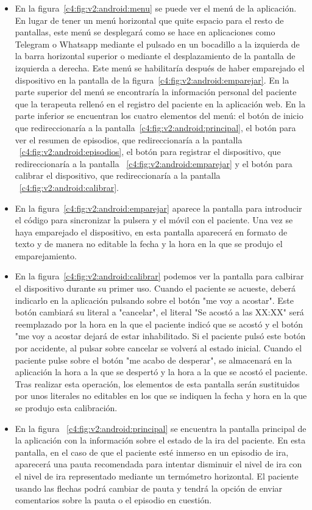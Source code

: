 \begin{itemize}
    \item En la figura~\ref{c4:fig:v2:android:menu} se puede ver el menú de la aplicación. En lugar de tener un menú horizontal que quite espacio para el resto de pantallas, este menú se desplegará como se hace en aplicaciones como Telegram o Whatsapp mediante el pulsado en un bocadillo a la izquierda de la barra horizontal superior o mediante el desplazamiento de la pantalla de izquierda a derecha. Este menú se habilitaría después de haber emparejado el dispositivo en la pantalla de la figura~\ref{c4:fig:v2:android:emparejar}. En la parte superior del menú se encontraría la información personal del paciente que la terapeuta rellenó en el registro del paciente en la aplicación web. En la parte inferior se encuentran los cuatro elementos del menú: el botón de inicio que redireccionaría a la pantalla~\ref{c4:fig:v2:android:principal}, el botón para ver el resumen de episodios, que redireccionaría a la pantalla ~\ref{c4:fig:v2:android:episodios}, el botón para registrar el dispositivo, que redireccionaría a la pantalla ~\ref{c4:fig:v2:android:emparejar} y el botón para calibrar el dispositivo, que redireccionaría a la pantalla ~\ref{c4:fig:v2:android:calibrar}.
    \item En la figura~\ref{c4:fig:v2:android:emparejar} aparece la pantalla para introducir el código para sincronizar la pulsera y el móvil con el paciente. Una vez se haya emparejado el dispositivo, en esta pantalla aparecerá en formato de texto y de manera no editable la fecha y la hora en la que se produjo el emparejamiento.
    \item En la figura~\ref{c4:fig:v2:android:calibrar} podemos ver la pantalla para calbirar el dispositivo durante su primer uso. Cuando el paciente se acueste, deberá indicarlo en la aplicación pulsando sobre el botón "me voy a acostar". Este botón cambiará su literal a "cancelar", el literal "Se acostó a las XX:XX" será reemplazado por la hora en la que el paciente indicó que se acostó y el botón "me voy a acostar dejará de estar inhabilitado. Si el paciente pulsó este botón por accidente, al pulsar sobre cancelar se volverá al estado inicial. Cuando el paciente pulse sobre el botón "me acabo de desperar", se almacenará en la aplicación la hora a la que se despertó y la hora a la que se acostó el paciente. Tras realizar esta operación, los elementos de esta pantalla serán sustituidos por unos literales no editables en los que se indiquen la fecha y hora en la que se produjo esta calibración.
    \item En la figura ~\ref{c4:fig:v2:android:principal} se encuentra la pantalla principal de la aplicación con la información sobre el estado de la ira del paciente. En esta pantalla, en el caso de que el paciente esté inmerso en un episodio de ira, aparecerá una pauta recomendada para intentar disminuir el nivel de ira con el nivel de ira representado mediante un termómetro horizontal. El paciente usando las flechas podrá cambiar de pauta y tendrá la opción de enviar comentarios sobre la pauta o el episodio en cuestión.
    

\end{itemize}
